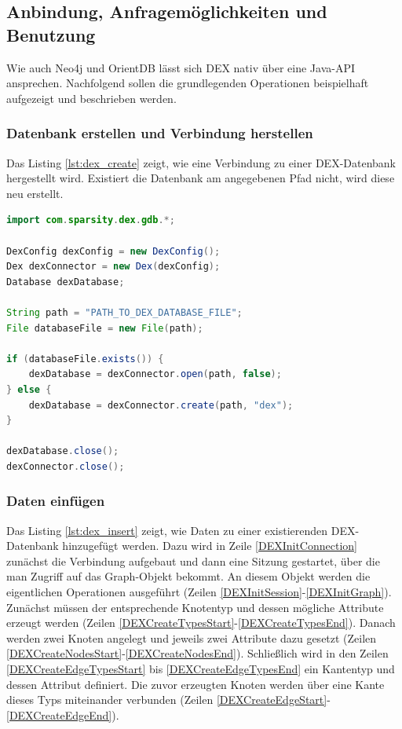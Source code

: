 \documentclass[11pt, a4paper, oneside]{article} %
\begin{document}
\subsection{Anbindung, Anfragemöglichkeiten und Benutzung}

Wie auch Neo4j und OrientDB lässt sich DEX nativ über eine Java-API ansprechen. Nachfolgend sollen die grundlegenden Operationen beispielhaft aufgezeigt und beschrieben werden.

\subsubsection{Datenbank erstellen und Verbindung herstellen}

Das Listing \ref{lst:dex_create} zeigt, wie eine Verbindung zu einer DEX-Datenbank hergestellt wird. Existiert die Datenbank am angegebenen Pfad nicht, wird diese neu erstellt.

\begin{lstlisting}[caption={DEX - Datenbank erstellen und Verbindung herstellen},label={lst:dex_create},language=Java]
import com.sparsity.dex.gdb.*;

DexConfig dexConfig = new DexConfig();
Dex dexConnector = new Dex(dexConfig);
Database dexDatabase;

String path = "PATH_TO_DEX_DATABASE_FILE";
File databaseFile = new File(path);

if (databaseFile.exists()) {
	dexDatabase = dexConnector.open(path, false);
} else {
	dexDatabase = dexConnector.create(path, "dex");
}

dexDatabase.close();
dexConnector.close();
\end{lstlisting}

\subsubsection{Daten einfügen}

Das Listing \ref{lst:dex_insert} zeigt, wie Daten zu einer existierenden DEX-Datenbank hinzugefügt werden. Dazu wird in Zeile \ref{DEXInitConnection} zunächst die Verbindung aufgebaut und dann eine Sitzung gestartet, über die man Zugriff auf das Graph-Objekt bekommt. An diesem Objekt werden die eigentlichen Operationen ausgeführt (Zeilen \ref{DEXInitSession}-\ref{DEXInitGraph}). Zunächst müssen der entsprechende Knotentyp und dessen mögliche Attribute erzeugt werden (Zeilen \ref{DEXCreateTypesStart}-\ref{DEXCreateTypesEnd}). Danach werden zwei Knoten angelegt und jeweils zwei Attribute dazu gesetzt (Zeilen \ref{DEXCreateNodesStart}-\ref{DEXCreateNodesEnd}). Schließlich wird in den Zeilen \ref{DEXCreateEdgeTypesStart} bis \ref{DEXCreateEdgeTypesEnd} ein Kantentyp und dessen Attribut definiert. Die zuvor erzeugten Knoten werden über eine Kante dieses Typs miteinander verbunden (Zeilen \ref{DEXCreateEdgeStart}-\ref{DEXCreateEdgeEnd}).
\end{document}
